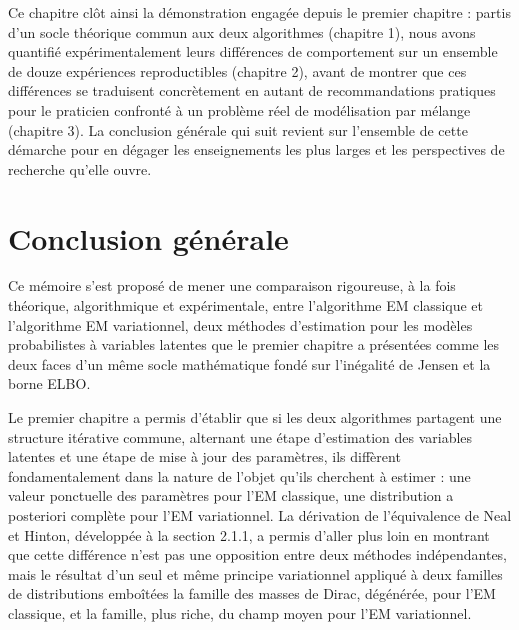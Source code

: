 Ce chapitre clôt ainsi la démonstration engagée depuis le premier chapitre : partis d'un socle théorique commun aux deux algorithmes (chapitre 1), nous avons quantifié expérimentalement leurs différences de comportement sur un ensemble de douze expériences reproductibles (chapitre 2), avant de montrer que ces différences se traduisent concrètement en autant de recommandations pratiques pour le praticien confronté à un problème réel de modélisation par mélange (chapitre 3). La conclusion générale qui suit revient sur l'ensemble de cette démarche pour en dégager les enseignements les plus larges et les perspectives de recherche qu'elle ouvre.


\chapter*{Conclusion générale}
Ce mémoire s'est proposé de mener une comparaison rigoureuse, à la fois théorique, algorithmique et expérimentale, entre l'algorithme EM classique et l'algorithme EM variationnel, deux méthodes d'estimation pour les modèles probabilistes à variables latentes que le premier chapitre a présentées comme les deux faces d'un même socle mathématique fondé sur l'inégalité de Jensen et la borne ELBO.

Le premier chapitre a permis d'établir que si les deux algorithmes partagent une structure itérative commune, alternant une étape d'estimation des variables latentes et une étape de mise à jour des paramètres, ils diffèrent fondamentalement dans la nature de l'objet qu'ils cherchent à estimer : une valeur ponctuelle des paramètres pour l'EM classique, une distribution a posteriori complète pour l'EM variationnel. La dérivation de l'équivalence de Neal et Hinton, développée à la section 2.1.1, a permis d'aller plus loin en montrant que cette différence n'est pas une opposition entre deux méthodes indépendantes, mais le résultat d'un seul et même principe variationnel appliqué à deux familles de distributions emboîtées  la famille des masses de Dirac, dégénérée, pour l'EM classique, et la famille, plus riche, du champ moyen pour l'EM variationnel.

